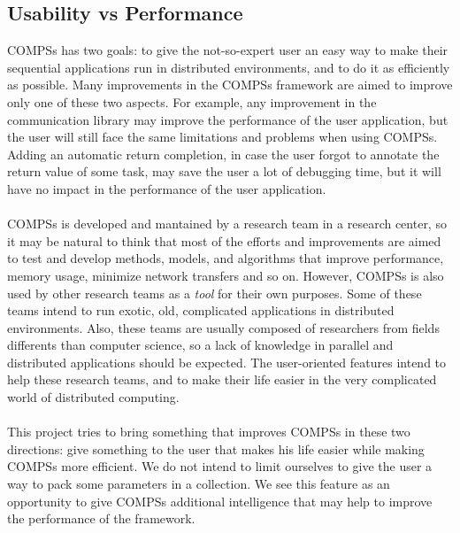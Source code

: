\subsection{Usability vs Performance}
\label{subsec:compss_ux_vs_perf}
COMPSs has two goals: to give the not-so-expert user an easy way to make their sequential applications run in distributed environments, and to do it as efficiently as possible. Many improvements in the COMPSs framework are aimed to improve only one of these two aspects. For example, any improvement in the communication library may improve the performance of the user application, but the user will still face the same limitations and problems when using COMPSs. Adding an automatic return completion, in case the user forgot to annotate the return value of some task, may save the user a lot of debugging time, but it will have no impact in the performance of the user application.\\
\\
COMPSs is developed and mantained by a research team in a research center, so it may be natural to think that most of the efforts and improvements are aimed to test and develop methods, models, and algorithms that improve performance, memory usage, minimize network transfers and so on. However, COMPSs is also used by other research teams as a \textit{tool} for their own purposes. Some of these teams intend to run exotic, old, complicated applications in distributed environments. Also, these teams are usually composed of researchers from fields differents than computer science, so a lack of knowledge in parallel and distributed applications should be expected. The user-oriented features intend to help these research teams, and to make their life easier in the very complicated world of distributed computing.\\
\\
This project tries to bring something that improves COMPSs in these two directions: give something to the user that makes his life easier while making COMPSs more efficient. We do not intend to limit ourselves to give the user a way to pack some parameters in a collection. We see this feature as an opportunity to give COMPSs additional intelligence that may help to improve the performance of the framework.
